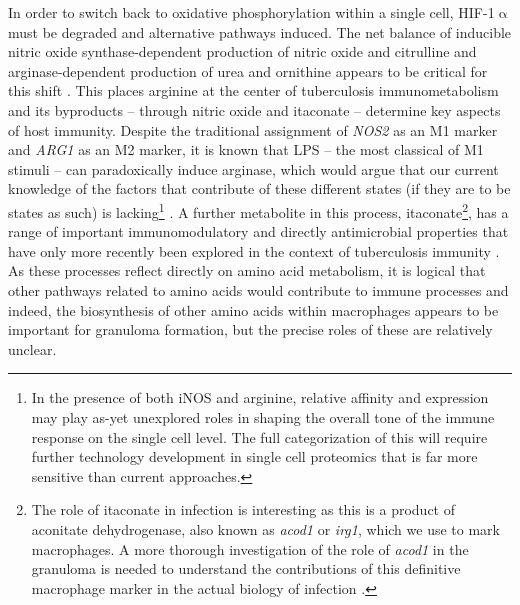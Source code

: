 In order to switch back to oxidative phosphorylation within a single cell, HIF\hyp{}1$\upalpha$ must be degraded and alternative pathways induced. The net balance of inducible nitric oxide synthase\hyp{}dependent production of nitric oxide and citrulline and arginase\hyp{}dependent production of urea and ornithine appears to be critical for this shift \citep{Palmieri2020, Qualls2016}. This places arginine at the center of tuberculosis immunometabolism and its byproducts -- through nitric oxide and itaconate -- determine key aspects of host immunity. Despite the traditional assignment of \textit{NOS2} as an M1 marker and \textit{ARG1} as an M2 marker, it is known that LPS -- the most classical of M1 stimuli -- can paradoxically induce arginase, which would argue that our current knowledge of the factors that contribute of these different states (if they are to be states as such) is lacking\footnote{In the presence of both iNOS and arginine, relative affinity and expression may play as\hyp{}yet unexplored roles in shaping the overall tone of the immune response on the single cell level. The full categorization of this will require further technology development in single cell proteomics that is far more sensitive than current approaches.} \citep{ElKasmi2008}. A further metabolite in this process, itaconate\footnote{The role of itaconate in infection is interesting as this is a product of aconitate dehydrogenase, also known as \textit{acod1} or \textit{irg1}, which we use to mark macrophages. A more thorough investigation of the role of \textit{acod1} in the granuloma is needed to understand the contributions of this definitive macrophage marker in the actual biology of infection \citep{Nair2018}.}, has a range of important immunomodulatory and directly antimicrobial properties that have only more recently been explored in the context of tuberculosis immunity \citep{Jinich2022, He2021}. As these processes reflect directly on amino acid metabolism, it is logical that other pathways related to amino acids would contribute to immune processes and indeed, the biosynthesis of other amino acids within macrophages appears to be important for granuloma formation, but the precise roles of these are relatively unclear.

